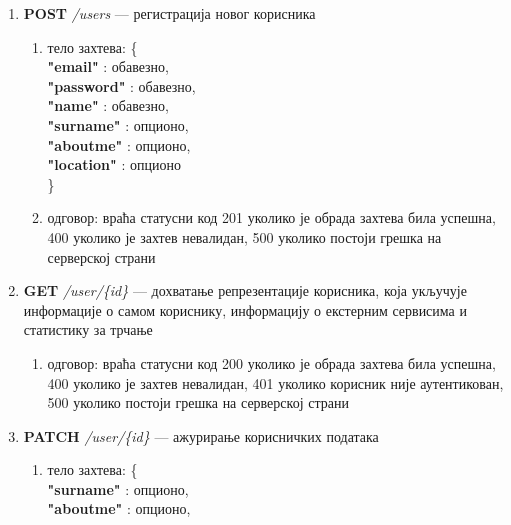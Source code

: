 \documentclass[12pt,oneside]{memoir}
\begin{document}
\begin{enumerate}
    \item \textbf{POST} \textit{/users} --- регистрација новог корисника
        \begin{enumerate}
            \item тело захтева: \{\\
                    \hspace*{1cm} \textbf{"email"} : обавезно,\\
                    \hspace*{1cm} \textbf{"password"} : обавезно,\\
                    \hspace*{1cm} \textbf{"name"} : обавезно,\\
                    \hspace*{1cm} \textbf{"surname"} : опционо,\\
                    \hspace*{1cm} \textbf{"aboutme"} : опционо,\\
                    \hspace*{1cm} \textbf{"location"} : опционо\\
                \}
            \item одговор: враћа статусни код 201 уколико је обрада захтева била успешна, 400 уколико је захтев невалидан, 500 уколико постоји грешка на серверској страни
        \end{enumerate}
    \item \textbf{GET} \textit{/user/\{id\}} --- дохватање репрезентације корисника, која укључује информације о самом кориснику, информацију о екстерним сервисима и статистику за трчање
        \begin{enumerate}
            \item одговор: враћа статусни код 200 уколико је обрада захтева била успешна, 400 уколико је захтев невалидан, 401 уколико корисник није аутентикован, 500 уколико постоји грешка на серверској страни
        \end{enumerate}
    \item \textbf{PATCH} \textit{/user/\{id\}} --- ажурирање корисничких података
        \begin{enumerate}
            \item тело захтева: \{\\
                    \hspace*{1cm} \textbf{"surname"} : опционо,\\
                    \hspace*{1cm} \textbf{"aboutme"} : опционо,\\

\end{enumerate}
\end{enumerate}
\end{document}
